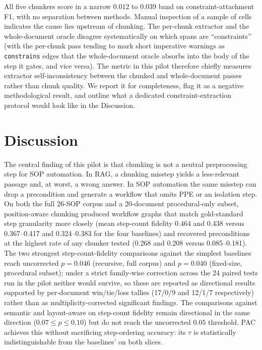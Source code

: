 \documentclass[fleqn,10pt]{wlscirep}
\begin{document}
All five chunkers score in a narrow 0.012 to 0.039 band on
constraint-attachment F1, with no separation between methods. Manual
inspection of a sample of cells indicates the cause lies upstream of
chunking. The per-chunk extractor and the whole-document oracle
disagree systematically on which spans are ``constraints'' (with the
per-chunk pass tending to mark short imperative warnings as
\texttt{constrains} edges that the whole-document oracle absorbs into
the body of the step it gates, and vice versa). The metric in this
pilot therefore chiefly measures extractor self-inconsistency between
the chunked and whole-document passes rather than chunk quality. We
report it for completeness, flag it as a negative methodological
result, and outline what a dedicated constraint-extraction protocol
would look like in the Discussion.

\section*{Discussion}

The central finding of this pilot is that chunking is not a neutral
preprocessing step for SOP automation. In RAG, a chunking misstep
yields a less-relevant passage and, at worst, a wrong answer. In SOP
automation the same misstep can drop a precondition and generate a
workflow that omits PPE or an isolation step. On both the full 26-SOP
corpus and a 20-document procedural-only subset, position-aware
chunking produced workflow graphs that match gold-standard step
granularity more closely (mean step-count fidelity 0.464 and 0.438
versus 0.367--0.417 and 0.324--0.383 for the four baselines) and
recovered preconditions at the highest rate of any chunker tested (0.268
and 0.208 versus 0.085--0.181). The two strongest step-count-fidelity comparisons against the
simplest baselines reach uncorrected $p=0.046$ (recursive, full
corpus) and $p=0.040$ (fixed-size, procedural subset); under a strict
family-wise correction across the 24 paired tests run in the pilot
neither would survive, so these are reported as directional results
supported by per-document win/tie/loss tallies (17/0/9 and 12/1/7
respectively) rather than as multiplicity-corrected significant
findings. The comparisons against semantic and layout-aware on
step-count fidelity remain directional in the same direction
($0.07\le p\le0.10$) but do not reach the uncorrected $0.05$ threshold. PAC achieves this without
sacrificing step-ordering accuracy: its $\tau$ is statistically
indistinguishable from the baselines' on both slices.
\end{document}
